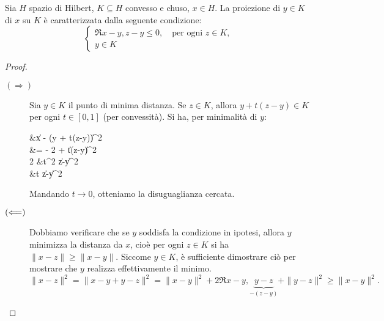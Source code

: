\begin{lemma}
\label{lemma:hilb_proj}
	Sia $H$ spazio di Hilbert, $K \subseteq H$ convesso e chuso, $x \in H$.
	La proiezione di $y \in K$ di $x$ su $K$ è caratterizzata dalla seguente condizione:
	\begin{equation*}
		\begin{cases}
			\Re{x-y, z-y} \leq 0, \quad \text{per ogni $z \in K$},\\
			y \in K
		\end{cases}
	\end{equation*}
\end{lemma}
\begin{proof}
	\begin{description}
		\item[$(\Longrightarrow)$] Sia $y \in K$ il punto di minima distanza. Se $z \in K$, allora $y + t(z-y) \in K$ per ogni $t \in [0,1]$ (per convessità). Si ha, per minimalità di $y$:
		\begin{eqalign*}
			 &\leq \|x - (y + t(z-y))\|^2\\
			&=  - 2 + \|t(z-y)\|^2\\[1ex]
			2 &\leq t^2 \|z-y\|^2\\[1ex]
			 &\leq t \|z-y\|^2
		\end{eqalign*}
		Mandando $t \to 0$, otteniamo la disuguaglianza cercata.

		\item[$(\Longleftarrow)$] Dobbiamo verificare che se $y$ soddisfa la condizione in ipotesi, allora $y$ minimizza la distanza da $x$, cioè per ogni $z \in K$ si ha $\|x-z\| \geq \|x-y\|$. Siccome $y \in K$, è sufficiente dimostrare ciò per mostrare che $y$ realizza effettivamente il minimo.
		\begin{equation*}
			\|x-z\|^2  = \|x-y+y-z\|^2 = \|x-y\|^2 + 2\Re{x-y,\underbrace{y-z}_{-(z-y)}} + \|y-z\|^2 \geq \|x-y\|^2.
		\end{equation*}
	\end{description}
\end{proof}

